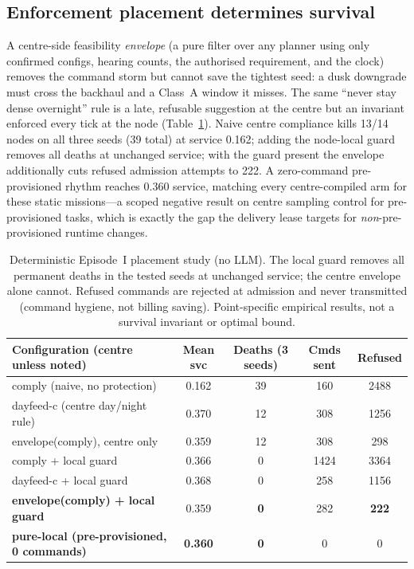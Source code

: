 \documentclass[11pt]{article}
\begin{document}
\subsection{Enforcement placement determines survival}
\label{sec:eval-place}
A centre-side feasibility \emph{envelope} (a pure filter over any planner using only confirmed
configs, hearing counts, the authorised requirement, and the clock) removes the command storm but
cannot save the tightest seed: a dusk downgrade must cross the backhaul and a Class~A window it
misses. The same ``never stay dense overnight'' rule is a late, refusable suggestion at the centre
but an invariant enforced every tick at the node (Table~\ref{tab:r39}). Naive centre compliance
kills 13/14 nodes on all three seeds (39 total) at service 0.162; adding the node-local guard
removes all deaths at unchanged service; with the guard present the envelope additionally cuts
refused admission attempts to 222. A zero-command pre-provisioned rhythm reaches 0.360 service,
matching every centre-compiled arm for these static missions---a scoped negative result on centre
sampling control for pre-provisioned tasks, which is exactly the gap the delivery lease targets
for \emph{non}-pre-provisioned runtime changes.

\begin{table}[h]
\centering\small
\begin{tabular}{lcccc}
\toprule
Configuration (centre unless noted) & Mean svc & Deaths (3 seeds) & Cmds sent & Refused\\
\midrule
comply (naive, no protection)                     & 0.162 & 39 & 160  & 2488\\
dayfeed-c (centre day/night rule)                 & 0.370 & 12 & 308  & 1256\\
envelope(comply), centre only                     & 0.359 & 12 & 308  & 298\\
comply + local guard                              & 0.366 & 0  & 1424 & 3364\\
dayfeed-c + local guard                           & 0.368 & 0  & 258  & 1156\\
\textbf{envelope(comply) + local guard}           & 0.359 & \textbf{0} & 282 & \textbf{222}\\
\midrule
\textbf{pure-local (pre-provisioned, 0 commands)} & \textbf{0.360} & \textbf{0} & 0 & 0\\
\bottomrule
\end{tabular}
\caption{Deterministic Episode~I placement study (no LLM). The local guard removes all permanent
deaths in the tested seeds at unchanged service; the centre envelope alone cannot. Refused
commands are rejected at admission and never transmitted (command hygiene, not billing saving).
Point-specific empirical results, not a survival invariant or optimal bound.}
\label{tab:r39}
\end{table}
\end{document}
